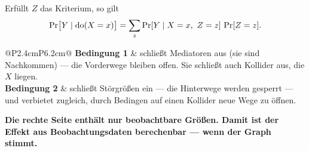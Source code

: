 \begin{merksatz}
Erfüllt $Z$ das Kriterium, so gilt
\[ \Pr\bigl[Y \mid \operatorname{do}(X=x)\bigr] = \sum_z \Pr[Y \mid X=x,\ Z=z]\,\Pr[Z=z] . \]

\begin{center}
{\small
\renewcommand{\arraystretch}{1.52}
\begin{tabular}{@{}P{2.4cm}P{6.2cm}@{}}
\toprule
\textbf{Bedingung 1} & schließt Mediatoren aus (sie sind Nachkommen) --- die Vorderwege bleiben offen. Sie schließt auch Kollider aus, die  $X$ liegen.\\
\textbf{Bedingung 2} & schließt Störgrößen ein --- die Hinterwege werden gesperrt --- und verbietet zugleich, durch Bedingen auf einen Kollider neue Wege zu öffnen.\\
\bottomrule
\end{tabular}}
\end{center}

\begin{center}
\begin{minipage}{0.9\textwidth}
\textbf{Die rechte Seite enthält nur beobachtbare Größen. Damit ist der Effekt aus Beobachtungsdaten berechenbar --- wenn der Graph stimmt.}
\end{minipage}
\end{center}

\begin{center}
\begin{minipage}{0.88\textwidth}
\end{minipage}
\end{center}
\end{merksatz}

